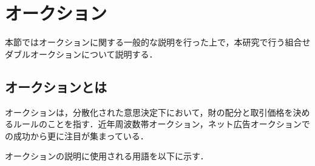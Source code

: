 \hypertarget{ux30aaux30fcux30afux30b7ux30e7ux30f3}{%
\section{オークション}\label{ux30aaux30fcux30afux30b7ux30e7ux30f3}}

本節ではオークションに関する一般的な説明を行った上で，本研究で行う組合せダブルオークションについて説明する．

\hypertarget{ux30aaux30fcux30afux30b7ux30e7ux30f3ux3068ux306f}{%
\subsection{オークションとは}\label{ux30aaux30fcux30afux30b7ux30e7ux30f3ux3068ux306f}}

オークションは，分散化された意思決定下において，財の配分と取引価格を決めるルールのことを指す\cite{market}．近年周波数帯オークション，ネット広告オークションでの成功から更に注目が集まっている\cite{yokoo}．

オークションの説明に使用される用語を以下に示す\cite{market}．

